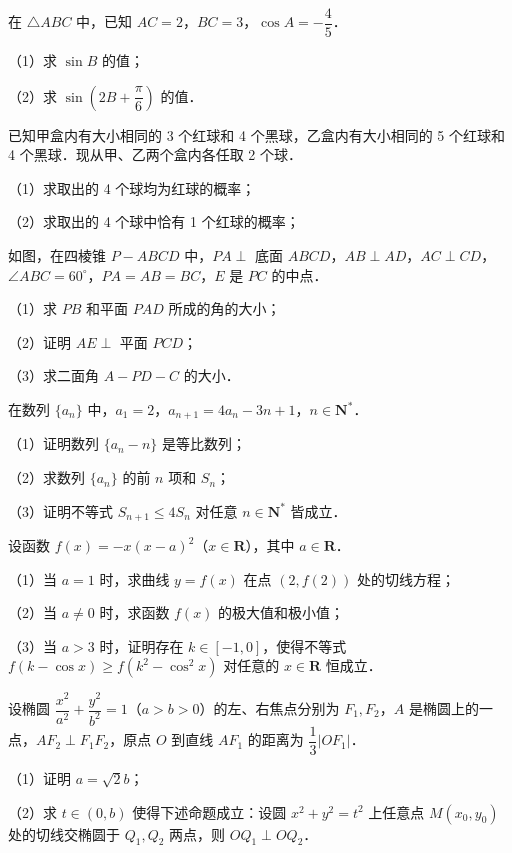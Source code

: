 \begin{question}
在 $\triangle ABC$ 中，已知 $AC=2$，$BC=3$，$\cos A=-\dfrac{4}{5}$．

（1）求 $\sin B$ 的值；

（2）求 $\sin\left(2B+\dfrac{\pi}{6}\right)$ 的值．

\end{question}
\begin{question}
已知甲盒内有大小相同的 3 个红球和 4 个黑球，乙盒内有大小相同的 5 个红球和 4 个黑球．现从甲、乙两个盒内各任取 2 个球．

（1）求取出的 4 个球均为红球的概率；

（2）求取出的 4 个球中恰有 1 个红球的概率；

\Needspace{0.4\textheight}
\end{question}
\begin{question}
如图，在四棱锥 $P-ABCD$ 中，$PA\perp$ 底面 $ABCD$，$AB\perp AD$，$AC\perp CD$，$\angle ABC=60^\circ$，$PA=AB=BC$，$E$ 是 $PC$ 的中点．

（1）求 $PB$ 和平面 $PAD$ 所成的角的大小；

（2）证明 $AE\perp$ 平面 $PCD$；

（3）求二面角 $A-PD-C$ 的大小．
\nopagebreak[4]
\begin{center}\end{center}
\nopagebreak[4]
\end{question}
\begin{question}
在数列 $\{a_n\}$ 中，$a_1=2$，$a_{n+1}=4a_n-3n+1$，$n\in\mathbf N^*$．

（1）证明数列 $\{a_n-n\}$ 是等比数列；

（2）求数列 $\{a_n\}$ 的前 $n$ 项和 $S_n$；

（3）证明不等式 $S_{n+1}\leqslant 4S_n$ 对任意 $n\in\mathbf N^*$ 皆成立．

\end{question}
\begin{question}
设函数 $f(x)=-x(x-a)^2$（$x\in\mathbf R$），其中 $a\in\mathbf R$．

（1）当 $a=1$ 时，求曲线 $y=f(x)$ 在点 $(2,f(2))$ 处的切线方程；

（2）当 $a\neq 0$ 时，求函数 $f(x)$ 的极大值和极小值；

（3）当 $a>3$ 时，证明存在 $k\in[-1,0]$，使得不等式 $f(k-\cos x)\geqslant f(k^2-\cos^2 x)$ 对任意的 $x\in\mathbf R$ 恒成立．

\end{question}
\begin{question}
设椭圆 $\dfrac{x^2}{a^2}+\dfrac{y^2}{b^2}=1$（$a>b>0$）的左、右焦点分别为 $F_1,F_2$，$A$ 是椭圆上的一点，$AF_2\perp F_1F_2$，原点 $O$ 到直线 $AF_1$ 的距离为 $\dfrac13|OF_1|$．

（1）证明 $a=\sqrt2 b$；

（2）求 $t\in(0,b)$ 使得下述命题成立：设圆 $x^2+y^2=t^2$ 上任意点 $M(x_0,y_0)$ 处的切线交椭圆于 $Q_1,Q_2$ 两点，则 $OQ_1\perp OQ_2$．

\end{question}